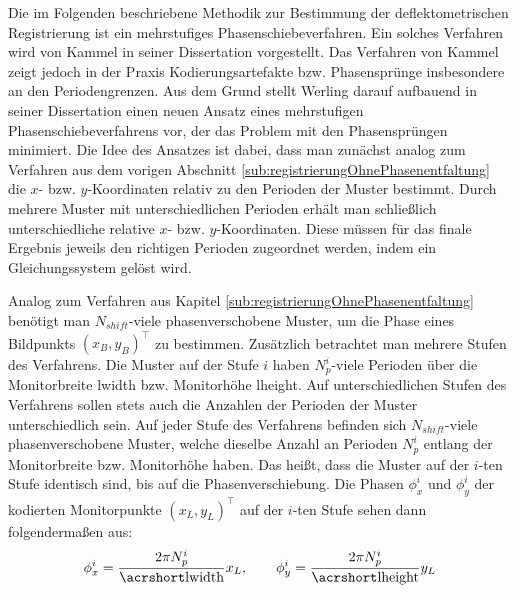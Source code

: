 Die im Folgenden beschriebene Methodik zur Bestimmung der deflektometrischen Registrierung ist ein mehrstufiges Phasenschiebeverfahren.
Ein solches Verfahren wird von Kammel in seiner Dissertation \cite{kit_kammel} vorgestellt.
Das Verfahren von Kammel zeigt jedoch in der Praxis Kodierungsartefakte bzw. Phasensprünge insbesondere an den Periodengrenzen.
Aus dem Grund stellt Werling darauf aufbauend in seiner Dissertation \cite{kit_werling} einen neuen Ansatz eines mehrstufigen Phasenschiebeverfahrens vor, der das Problem mit den Phasensprüngen minimiert.
Die Idee des Ansatzes ist dabei, dass man zunächst analog zum Verfahren aus dem vorigen Abschnitt \ref{sub:registrierungOhnePhasenentfaltung} die $x$- bzw. $y$-Koordinaten relativ zu den Perioden der Muster bestimmt.
Durch mehrere Muster mit unterschiedlichen Perioden erhält man schließlich unterschiedliche relative $x$- bzw. $y$-Koordinaten.
Diese müssen für das finale Ergebnis jeweils den richtigen Perioden zugeordnet werden, indem ein Gleichungssystem gelöst wird.

\p
Analog zum Verfahren aus Kapitel \ref{sub:registrierungOhnePhasenentfaltung} benötigt man $N_{shift}$-viele phasenverschobene Muster, um die Phase eines Bildpunkts $(x_B, y_B)^\top$ zu bestimmen.
Zusätzlich betrachtet man mehrere Stufen des Verfahrens.
Die Muster auf der Stufe $i$ haben $N_p^i$-viele Perioden über die Monitorbreite \acrshort{lwidth} bzw. Monitorhöhe \acrshort{lheight}.
Auf unterschiedlichen Stufen des Verfahrens sollen stets auch die Anzahlen der Perioden der Muster unterschiedlich sein.
Auf jeder Stufe des Verfahrens befinden sich $N_{shift}$-viele phasenverschobene Muster, welche dieselbe Anzahl an Perioden $N_p^i$ entlang der Monitorbreite bzw. Monitorhöhe haben.
Das heißt, dass die Muster auf der $i$-ten Stufe identisch sind, bis auf die Phasenverschiebung.
Die Phasen $\phi_x^i$ und $\phi_y^i$ der kodierten Monitorpunkte $(x_L, y_L)^\top$ auf der $i$-ten Stufe sehen dann folgendermaßen aus:
%
\begin{equation}
	\phi_x^i = \dfrac{2\pi N_p^i}{\acrshortmath{lwidth}} x_L,
	\qquad
	\phi_y^i = \dfrac{2\pi N_p^i}{\acrshortmath{lheight}} y_L
\end{equation}

